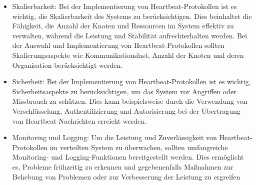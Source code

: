 \begin{itemize}
\item Skalierbarkeit: Bei der Implementierung von Heartbeat-Protokollen ist es wichtig, die Skalierbarkeit des Systems zu berücksichtigen. Dies beinhaltet die Fähigkeit, die Anzahl der Knoten und Ressourcen im System effektiv zu verwalten, während die Leistung und Stabilität aufrechterhalten werden. Bei der Auswahl und Implementierung von Heartbeat-Protokollen sollten Skalierungsaspekte wie Kommunikationslast, Anzahl der Knoten und deren Organisation berücksichtigt werden.
\item Sicherheit: Bei der Implementierung von Heartbeat-Protokollen ist es wichtig, Sicherheitsaspekte zu berücksichtigen, um das System vor Angriffen oder Missbrauch zu schützen. Dies kann beispielsweise durch die Verwendung von Verschlüsselung, Authentifizierung und Autorisierung bei der Übertragung von Heartbeat-Nachrichten erreicht werden.
\item Monitoring und Logging: Um die Leistung und Zuverlässigkeit von Heartbeat-Protokollen im verteilten System zu überwachen, sollten umfangreiche Monitoring- und Logging-Funktionen bereitgestellt werden. Dies ermöglicht es, Probleme frühzeitig zu erkennen und gegebenenfalls Maßnahmen zur Behebung von Problemen oder zur Verbesserung der Leistung zu ergreifen
\end{itemize} 

